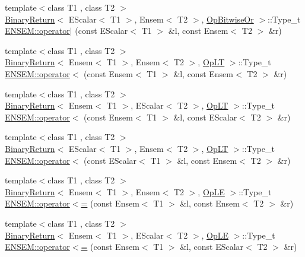 \begin{DoxyCompactItemize}
\item 
{\footnotesize template$<$class T1 , class T2 $>$ }\\\mbox{\hyperlink{structBinaryReturn}{Binary\+Return}}$<$ E\+Scalar$<$ T1 $>$, Ensem$<$ T2 $>$, \mbox{\hyperlink{structOpBitwiseOr}{Op\+Bitwise\+Or}} $>$\+::Type\+\_\+t \mbox{\hyperlink{group__eensem_gacc25f74aa29769c6afffde4164c7821c}{E\+N\+S\+E\+M\+::operator$\vert$}} (const E\+Scalar$<$ T1 $>$ \&l, const Ensem$<$ T2 $>$ \&r)
\item 
{\footnotesize template$<$class T1 , class T2 $>$ }\\\mbox{\hyperlink{structBinaryReturn}{Binary\+Return}}$<$ Ensem$<$ T1 $>$, Ensem$<$ T2 $>$, \mbox{\hyperlink{structOpLT}{Op\+LT}} $>$\+::Type\+\_\+t \mbox{\hyperlink{group__eensem_ga1d5f68e8b9ac25bf882bfdfda50cf24b}{E\+N\+S\+E\+M\+::operator$<$}} (const Ensem$<$ T1 $>$ \&l, const Ensem$<$ T2 $>$ \&r)
\item 
{\footnotesize template$<$class T1 , class T2 $>$ }\\\mbox{\hyperlink{structBinaryReturn}{Binary\+Return}}$<$ Ensem$<$ T1 $>$, E\+Scalar$<$ T2 $>$, \mbox{\hyperlink{structOpLT}{Op\+LT}} $>$\+::Type\+\_\+t \mbox{\hyperlink{group__eensem_ga4f6f9b0944034ade90afab94b38db470}{E\+N\+S\+E\+M\+::operator$<$}} (const Ensem$<$ T1 $>$ \&l, const E\+Scalar$<$ T2 $>$ \&r)
\item 
{\footnotesize template$<$class T1 , class T2 $>$ }\\\mbox{\hyperlink{structBinaryReturn}{Binary\+Return}}$<$ E\+Scalar$<$ T1 $>$, Ensem$<$ T2 $>$, \mbox{\hyperlink{structOpLT}{Op\+LT}} $>$\+::Type\+\_\+t \mbox{\hyperlink{group__eensem_ga32b783bbc9759bd7ae2cbaa1f757f87d}{E\+N\+S\+E\+M\+::operator$<$}} (const E\+Scalar$<$ T1 $>$ \&l, const Ensem$<$ T2 $>$ \&r)
\item 
{\footnotesize template$<$class T1 , class T2 $>$ }\\\mbox{\hyperlink{structBinaryReturn}{Binary\+Return}}$<$ Ensem$<$ T1 $>$, Ensem$<$ T2 $>$, \mbox{\hyperlink{structOpLE}{Op\+LE}} $>$\+::Type\+\_\+t \mbox{\hyperlink{group__eensem_ga2a70dca80960fd84a701d582cced7d40}{E\+N\+S\+E\+M\+::operator$<$=}} (const Ensem$<$ T1 $>$ \&l, const Ensem$<$ T2 $>$ \&r)
\item 
{\footnotesize template$<$class T1 , class T2 $>$ }\\\mbox{\hyperlink{structBinaryReturn}{Binary\+Return}}$<$ Ensem$<$ T1 $>$, E\+Scalar$<$ T2 $>$, \mbox{\hyperlink{structOpLE}{Op\+LE}} $>$\+::Type\+\_\+t \mbox{\hyperlink{group__eensem_gaf74453e608d97ecc1e832a7b2a8fe3de}{E\+N\+S\+E\+M\+::operator$<$=}} (const Ensem$<$ T1 $>$ \&l, const E\+Scalar$<$ T2 $>$ \&r)

\end{DoxyCompactItemize}
